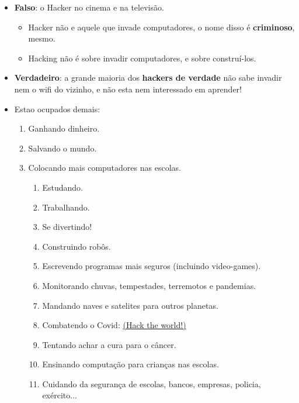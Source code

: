 \begin{multicols}{2}
\begin{itemize}
	\item \textbf{Falso}: o Hacker no cinema e na televisão.
\begin{itemize}
	\item Hacker não e aquele que invade computadores, o nome disso é \textbf{criminoso}, mesmo.
	\item Hacking não é sobre invadir computadores, e sobre construí-los.
\end{itemize}
	\item \textbf{Verdadeiro}: a grande maioria dos \textbf{hackers de verdade} não sabe invadir nem o wifi do vizinho, e não esta nem interessado em aprender!
	\item Estao ocupados demais:
	\begin{enumerate}
		\item Ganhando dinheiro.
		\item Salvando o mundo.
		\item Colocando mais computadores nas escolas.
		\begin{enumerate}
			\item Estudando.
			\item Trabalhando.
			\item Se divertindo!
			\item Construindo robôs.
			\item Escrevendo programas mais seguros (incluindo video-games).
			\item Monitorando chuvas, tempestades, terremotos e pandemias.
			\item Mandando naves e satelites para outros planetas.
			\item 		Combatendo o Covid: \href{https://brasil.io/covid19/}{ (Hack the world!)}
			\item Tentando achar a cura para o câncer.
			\item Ensinando computação para crianças nas escolas.
			\item Cuidando da segurança de escolas, bancos, empresas, policia, exército...
		\end{enumerate}
	\end{enumerate}
\end{itemize}
\begin{enumerate}
	

\end{enumerate}
\end{multicols}
